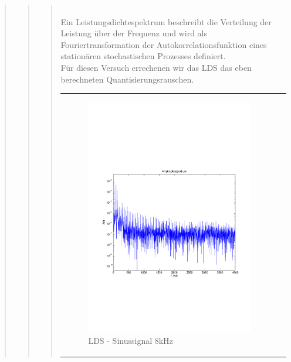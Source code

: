 \begin{quote}
\begin{quote}
\begin{quote}
		
		 \\
		
		
		Ein Leistungsdichtespektrum beschreibt die Verteilung der Leistung über der Frequenz und wird als
		Fouriertransformation der Autokorrelationsfunktion eines stationären stochastischen Prozesses definiert.\cite{LDS}\\
		Für diesen Versuch errechenen wir das LDS das eben berechneten Quantisierungsrauschen. 

        \begin{center}
            \begin{tabular}{ll}
            
            \hspace{-4cm}
                
                \begin{minipage}{0.55\textwidth}
                    \begin{figure}[H]
                        \includegraphics[scale=0.4, trim = 1.5cm 7cm 1.5cm 8cm, clip]
                        {./Bilder/sin8_Quantisierungsfehler_LDS}
                          \caption{LDS - Sinussignal 8kHz}
                    \end{figure}
                \end{minipage}
                              

\end{tabular}
\end{center}
\end{quote}
\end{quote}
\end{quote}
